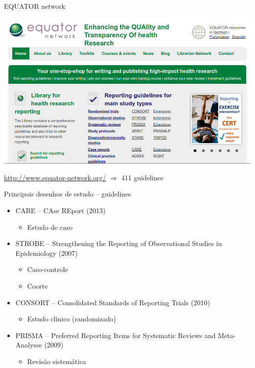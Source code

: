 \documentclass{beamer}
\begin{document}
\begin{frame}{EQUATOR network}
  \begin{center}
    \includegraphics[width=\textwidth]{Metodos/equator-net}

    \bigskip
    \tiny
    \url{http://www.equator-network.org/} $\Rightarrow$ 411 guidelines
  \end{center}
\end{frame}

\begin{frame}{Principais desenhos de estudo -- guidelines}
  \begin{itemize}
    \footnotesize
  \item CARE -- {\scriptsize CAse REport (2013)}
    \begin{itemize}
    \item Estudo de caso
    \end{itemize}
  \end{itemize}
  \begin{itemize}
    \footnotesize
  \item STROBE -- {\scriptsize Strengthening the Reporting of Observational Studies in Epidemiology (2007)}
    \begin{itemize}
    \item Caso-controle
    \item Coorte
    \end{itemize}
  \end{itemize}
  \begin{itemize}
  \item CONSORT -- {\scriptsize Consolidated Standards of Reporting Trials (2010)}
    \begin{itemize}
      \footnotesize
    \item Estudo clínico (randomizado)
    \end{itemize}
  \end{itemize}
  \begin{itemize}
    \footnotesize
  \item<2-> PRISMA -- {\scriptsize Preferred Reporting Items for Systematic Reviews and Meta-Analyses (2009)}
    \begin{itemize}
    \item Revisão sistemática
    \end{itemize}
  \end{itemize}
\end{frame}
\end{document}
